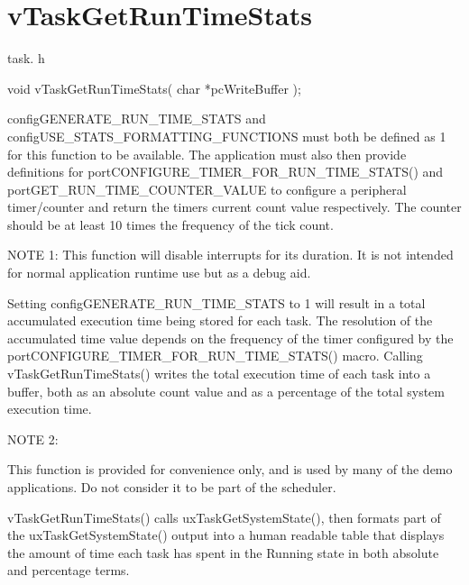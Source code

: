 \hypertarget{group__v_task_get_run_time_stats}{\section{v\-Task\-Get\-Run\-Time\-Stats}
\label{group__v_task_get_run_time_stats}
}
task. h 
\begin{DoxyPre}void vTaskGetRunTimeStats( char *pcWriteBuffer );\end{DoxyPre}


config\-G\-E\-N\-E\-R\-A\-T\-E\-\_\-\-R\-U\-N\-\_\-\-T\-I\-M\-E\-\_\-\-S\-T\-A\-T\-S and config\-U\-S\-E\-\_\-\-S\-T\-A\-T\-S\-\_\-\-F\-O\-R\-M\-A\-T\-T\-I\-N\-G\-\_\-\-F\-U\-N\-C\-T\-I\-O\-N\-S must both be defined as 1 for this function to be available. The application must also then provide definitions for port\-C\-O\-N\-F\-I\-G\-U\-R\-E\-\_\-\-T\-I\-M\-E\-R\-\_\-\-F\-O\-R\-\_\-\-R\-U\-N\-\_\-\-T\-I\-M\-E\-\_\-\-S\-T\-A\-T\-S() and port\-G\-E\-T\-\_\-\-R\-U\-N\-\_\-\-T\-I\-M\-E\-\_\-\-C\-O\-U\-N\-T\-E\-R\-\_\-\-V\-A\-L\-U\-E to configure a peripheral timer/counter and return the timers current count value respectively. The counter should be at least 10 times the frequency of the tick count.

N\-O\-T\-E 1\-: This function will disable interrupts for its duration. It is not intended for normal application runtime use but as a debug aid.

Setting config\-G\-E\-N\-E\-R\-A\-T\-E\-\_\-\-R\-U\-N\-\_\-\-T\-I\-M\-E\-\_\-\-S\-T\-A\-T\-S to 1 will result in a total accumulated execution time being stored for each task. The resolution of the accumulated time value depends on the frequency of the timer configured by the port\-C\-O\-N\-F\-I\-G\-U\-R\-E\-\_\-\-T\-I\-M\-E\-R\-\_\-\-F\-O\-R\-\_\-\-R\-U\-N\-\_\-\-T\-I\-M\-E\-\_\-\-S\-T\-A\-T\-S() macro. Calling v\-Task\-Get\-Run\-Time\-Stats() writes the total execution time of each task into a buffer, both as an absolute count value and as a percentage of the total system execution time.

N\-O\-T\-E 2\-:

This function is provided for convenience only, and is used by many of the demo applications. Do not consider it to be part of the scheduler.

v\-Task\-Get\-Run\-Time\-Stats() calls ux\-Task\-Get\-System\-State(), then formats part of the ux\-Task\-Get\-System\-State() output into a human readable table that displays the amount of time each task has spent in the Running state in both absolute and percentage terms.

